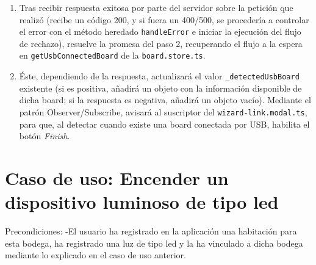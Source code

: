 \begin{enumerate}
\item  Tras recibir respuesta exitosa por parte del servidor sobre la petición que realizó (recibe un código 200, y si fuera un 400/500, se procedería a controlar el error con el método heredado \verb|handleError| e iniciar la ejecución del flujo de rechazo), resuelve la promesa del paso 2, recuperando el flujo a la espera en \verb|getUsbConnectedBoard| de la \verb|board.store.ts|.

\item  Éste, dependiendo de la respuesta, actualizará el valor \verb|_detectedUsbBoard| existente (si es positiva, añadirá un objeto con la información disponible de dicha board; si la respuesta es negativa, añadirá un objeto vacío). Mediante el patrón Observer/Subscribe, avisará al suscriptor del \verb|wizard-link.modal.ts|, para que, al detectar cuando existe una board conectada por USB, habilita el botón \textit{Finish}.
\end{enumerate}

\section{Caso de uso: Encender un dispositivo luminoso de tipo led}
\label{ch:Capitulo5.3}
Precondiciones:
    -El usuario ha registrado en la aplicación una habitación para esta bodega, ha registrado una luz de tipo led y la ha vinculado a dicha bodega mediante lo explicado en el caso de uso anterior.

